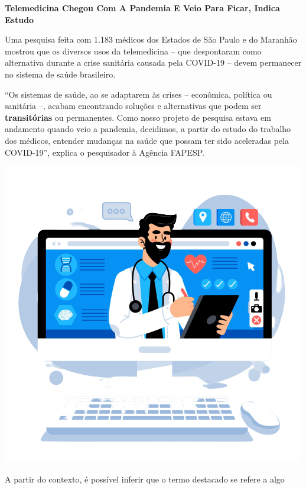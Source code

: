 \begin{myquote}
\textbf{Telemedicina Chegou Com A Pandemia E Veio Para Ficar, Indica Estudo}

Uma pesquisa feita com 1.183 médicos dos Estados de São Paulo e do
Maranhão mostrou que os diversos usos da telemedicina -- que despontaram
como alternativa durante a crise sanitária causada pela COVID-19 --
devem permanecer no sistema de saúde brasileiro.

``Os sistemas de saúde, ao se adaptarem às crises -- econômica, política
ou sanitária --, acabam encontrando soluções e alternativas que podem
ser \textbf{transitórias} ou permanentes. Como nosso projeto de pesquisa
estava em andamento quando veio a pandemia, decidimos, a partir do
estudo do trabalho dos médicos, entender mudanças na saúde que possam
ter sido aceleradas pela COVID-19'', explica o pesquisador à Agência
FAPESP.

\begin{center}
\includegraphics[width=.8\textwidth]{media/image46.png}
\end{center}

\end{myquote}

A partir do contexto, é possível inferir que o termo destacado se
refere a algo

